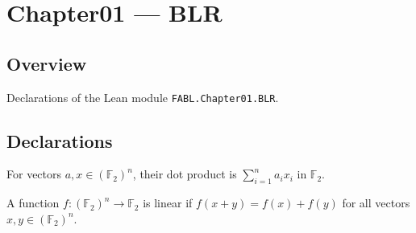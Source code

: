 \chapter{Chapter01 — BLR}
\section{Overview}

Declarations of the Lean module \texttt{FABL.Chapter01.BLR}.

\section{Declarations}

\begin{definition}
\leanok
{}
For vectors $a,x\in (\mathbb{F}_2)^n$, their dot product is $\sum_{i=1}^n a_i x_i$ in
$\mathbb{F}_2$.
\end{definition}

\begin{definition}
\leanok
{}
A function $f:(\mathbb{F}_2)^n\to\mathbb{F}_2$ is linear if $f(x+y)=f(x)+f(y)$ for all
vectors $x,y\in(\mathbb{F}_2)^n$.
\end{definition}

